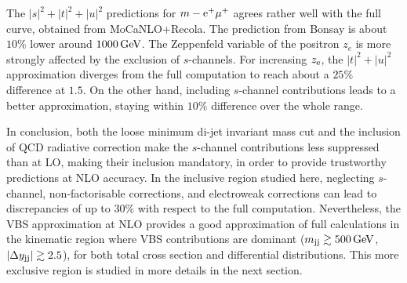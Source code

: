 %
The $|s|^2+|t|^2+|u|^2$ predictions for $m-{\rm e^+\mu^+}$ agrees rather well with the full curve, obtained from {\sc MoCa\-NLO+Recola}.
The prediction from {\sc Bonsay} is about $10\%$ lower around $1000 \,\text{GeV}$.
The Zeppenfeld variable of the positron $z_e$ is more strongly affected by the exclusion of $s$-channels.
For increasing $z_{\rm e}$, the $|t|^2+|u|^2$ approximation diverges from the full computation to reach about a $25\%$ difference  at $1.5$.
On the other hand, including $s$-channel contributions leads to a better approximation, staying within $10\%$ difference over the whole range.

In conclusion, both the loose minimum di-jet invariant mass cut and the inclusion of QCD radiative correction make the $s$-channel contributions less suppressed than at LO, making their inclusion mandatory, in order to provide trustworthy predictions at NLO accuracy.
In the inclusive region studied here, neglecting $s$-channel, non-factorisable corrections, and electroweak corrections can lead to discrepancies of up to $30\%$ with respect to the full computation.
Nevertheless, the VBS approximation at NLO provides a good approximation of full calculations in the kinematic region where VBS contributions are dominant ($m_{\text{j}\text{j}} \gtrsim 500 \,\text{GeV}$, $|\Delta y_{\text{j}\text{j}}| \gtrsim 2.5$), for both total cross section and differential distributions.
This more exclusive region is studied in more details in the next section.